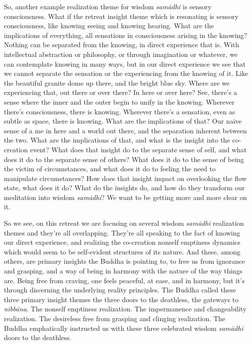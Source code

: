 \documentclass[12pt,openany]{book}
\begin{document}
So, another example realization theme for wisdom \textit{samādhi} is sensory consciousness. What if the retreat insight theme which is resonating is sensory consciousness, like knowing seeing and knowing hearing. What are the implications of everything, all sensations in consciousness arising in the knowing? Nothing can be separated \linebreak from the knowing, in direct experience that is. With intellectual abstraction or philosophy, or through imagination or whatever, we can contemplate knowing in many ways, but in our direct experience we see that we cannot separate the sensation or the experiencing from the knowing of it. Like the beautiful granite dome up there, and the bright blue sky. Where are we experiencing that, out there or over there? In here or over here? See, there's a sense where the inner and the outer begin to unify in the knowing. Wherever there’s consciousness, there is knowing. Wherever there’s a sensation, even as subtle as space, there is knowing. What are the implications of that? Our naive sense of a me in here and a world out there, and the separation inherent between the two. What are the implications of that, and what is the insight into the co-creation event? What does that insight do to the separate sense of self, and what does it do to the separate sense of others? What does it do to the sense of being the victim of circumstances, and what does it do to feeling the need to manipulate circumstances? How does that insight impact on overlooking the flow state, what does it do? What do the insights do, and how do they transform our meditation into wisdom \textit{samādhi}? We want to be getting more and more clear on it.

So we see, on this retreat we are focusing on several wisdom \textit{sa\-mā\-dhi} realization themes and they're all overlapping. They're all speaking to the fact of knowing our direct experience, and realizing the co-creation nonself emptiness dynamics which would seem to be self-evident structures of its nature. And these, among others, are primary insights the Buddha is pointing to, to free us from ignorance and grasping, and a way of being in harmony with the nature of the way things are. Being free from craving, one feels peaceful, at ease, and in harmony, but it's through discerning the underlying reality principles. The Buddha called these three primary insight themes the three doors to the deathless, the gateways to \textit{nibbāna}. The nonself emptiness realization. The impermanence and changeability realization. The desireless free from grasping and clinging realization. The Buddha emphatically instructed us with these three celebrated wisdom \textit{samādhi} doors to the deathless.
\end{document}
